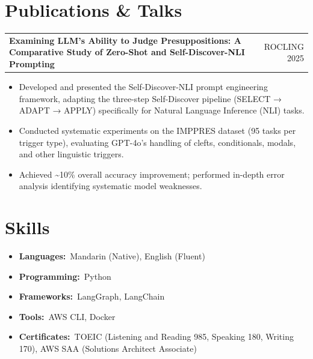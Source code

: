 \documentclass[11pt,a4paper]{article}
\makeatletter
\newcommand{\arrowright}{{\symbolfont →}}
\newcommand{\arrowright}{\ensuremath{\rightarrow}}
\newcommand{\entryhead}[2]{%
  \begin{tabularx}{\linewidth}{@{}Xr@{}}
    \textbf{\fontsize{10.5pt}{13pt}\selectfont #1} &
    {\color{inkmuted}\fontsize{9.5pt}{12pt}\selectfont #2}
  \end{tabularx}%
}
\makeatother
\begin{document}
\section{Publications \& Talks}
\entryhead{Examining LLM's Ability to Judge Presuppositions: A Comparative Study of Zero-Shot and Self-Discover-NLI Prompting}{ROCLING 2025}
\begin{itemize}
  \item Developed and presented the \textquotedbl{}Self-Discover-NLI\textquotedbl{} prompt engineering framework, adapting the three-step Self-Discover pipeline (SELECT \arrowright{} ADAPT \arrowright{} APPLY) specifically for Natural Language Inference (NLI) tasks.
  \item Conducted systematic experiments on the IMPPRES dataset (95 tasks per trigger type), evaluating GPT-4o's handling of clefts, conditionals, modals, and other linguistic triggers.
  \item Achieved \textasciitilde{}10\% overall accuracy improvement; performed in-depth error analysis identifying systematic model weaknesses.
\end{itemize}

\section{Skills}
\begin{itemize}[label={},leftmargin=0pt,itemsep=0.7mm]
  \item \textbf{Languages:}\ Mandarin (Native), English (Fluent)
  \item \textbf{Programming:}\ Python
  \item \textbf{Frameworks:}\ LangGraph, LangChain
  \item \textbf{Tools:}\ AWS CLI, Docker
  \item \textbf{Certificates:}\ TOEIC (Listening and Reading 985, Speaking 180, Writing 170), AWS SAA (Solutions Architect Associate)
\end{itemize}
\end{document}
